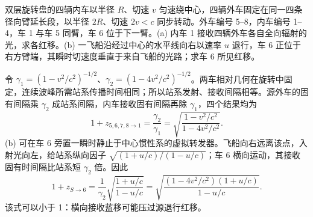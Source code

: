 \begin{exercise}
双层旋转盘的四辆内车以半径 $R$、切速 $v$ 匀速绕中心，四辆外车固定在同一四条径向臂延长段，以半径 $2R$、切速 $2v<c$ 同步转动。外车编号 5--8，内车编号 1--4，车 1 与车 5 同臂，车 6 位于下一臂。(a) 内车 1 接收四辆外车各自全向辐射的光，求各红移。(b) 一飞船沿经过中心的水平线向右以速率 $u$ 退行，车 6 正位于右方臂端，其瞬时切速度垂直于来自飞船的光路；求车 6 所见红移。
\end{exercise}
\begin{solution}
令 $\gamma_1=(1-v^2/c^2)^{-1/2}$、$\gamma_2=(1-4v^2/c^2)^{-1/2}$。两车相对几何在旋转中固定，连续波峰所需站系传播时间相同；所以站系发射、接收间隔相等。源外车的固有间隔乘 $\gamma_2$ 成站系间隔，内车接收固有间隔再除 $\gamma_1$，四个结果均为
\[
1+z_{5,6,7,8\to1}=\frac{\gamma_2}{\gamma_1}
=\sqrt{\frac{1-v^2/c^2}{1-4v^2/c^2}}.
\]
(b) 可在车 6 旁置一瞬时静止于中心惯性系的虚拟转发器。飞船向右远离该点，入射光向左，给站系纵向因子 $\sqrt{(1+u/c)/(1-u/c)}$；车 6 横向运动，其接收固有时间隔比站系短 $\gamma_2$ 倍。因此
\[
1+z_{S\to6}=\frac1{\gamma_2}
\sqrt{\frac{1+u/c}{1-u/c}}
=\sqrt{\frac{(1-4v^2/c^2)(1+u/c)}{1-u/c}}.
\]
该式可以小于 1：横向接收蓝移可能压过源退行红移。
\end{solution}
